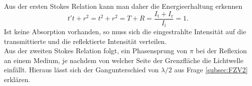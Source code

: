 Aus der ersten Stokes Relation kann man daher die Energieerhaltung erkennen
\begin{equation}
    t't + r^{2} = t^{2} + r^{2} = T + R = \frac{I_{\text{t}} + I_{\text{r}}}{I_{\text{i}}} = 1.
\end{equation}
Ist keine Absorption vorhanden, so muss sich die eingestrahlte Intensität auf die transmittierte und die reflektierte Intensität 
verteilen. \\ 
Aus der zweiten Stokes Relation folgt, ein Phasensprung von $\pi$ 
bei der Reflexion an einem Medium, je nachdem von welcher Seite der Grenzfläche die Lichtwelle einfällt. 
Hieraus lässt sich der Gangunterschied von $\lambda / 2$ aus Frage \ref{subsec:FZV2} erklären. \\  
